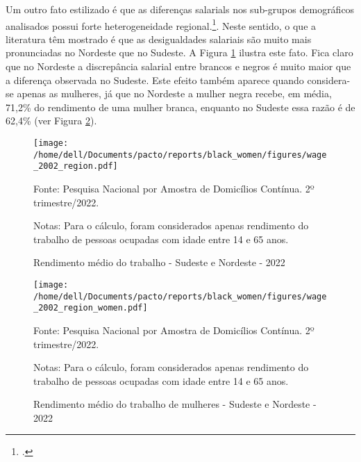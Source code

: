 \documentclass[12pt]{article}
\begin{document}
\par Um outro fato estilizado é que as diferenças salarials nos sub-grupos de\-mo\-grá\-fi\-cos analisados possui forte heterogeneidade regional.\footcite{campante2004desigualdade}. Neste sentido, o que a literatura têm mostrado é que as desigualdades salariais são muito mais pronunciadas no Nordeste que no Sudeste. A Figura \ref{fig:rendimento_regiao} ilustra este fato. Fica claro que no Nordeste a discrepância salarial entre brancos e negros é muito maior que a diferença observada no Sudeste. Este efeito também aparece quando considera-se apenas as mulheres, já que no Nordeste a mulher negra recebe, em média, 71,2\% do rendimento de uma mulher branca, enquanto no Sudeste essa razão é de 62,4\% (ver Figura \ref{fig:rendimento_regiao_sexo}).


\begin{figure}[H]
    \centering
    \caption{Rendimento médio do trabalho - Sudeste e Nordeste - 2022}
        \texttt{[image: /home/dell/Documents/pacto/reports/black\_women/figures/wage\_2002\_region.pdf]}
    \label{fig:rendimento_regiao}
    \begin{floatnotes}
        \item[Fonte:] Pesquisa Nacional por Amostra de Domicílios Contínua. 2º trimestre/2022.
        \item[Notas:] Para o cálculo, foram considerados apenas rendimento do trabalho de pessoas ocupadas com idade entre 14 e 65 anos.
    \end{floatnotes}
\end{figure}

\begin{figure}[H]
    \centering
    \caption{Rendimento médio do trabalho de mulheres - Sudeste e Nordeste - 2022}
        \texttt{[image: /home/dell/Documents/pacto/reports/black\_women/figures/wage\_2002\_region\_women.pdf]}
    \label{fig:rendimento_regiao_sexo}
    \begin{floatnotes}
        \item[Fonte:] Pesquisa Nacional por Amostra de Domicílios Contínua. 2º trimestre/2022.
        \item[Notas:] Para o cálculo, foram considerados apenas rendimento do trabalho de pessoas ocupadas com idade entre 14 e 65 anos.
    \end{floatnotes}
\end{figure}
\end{document}
